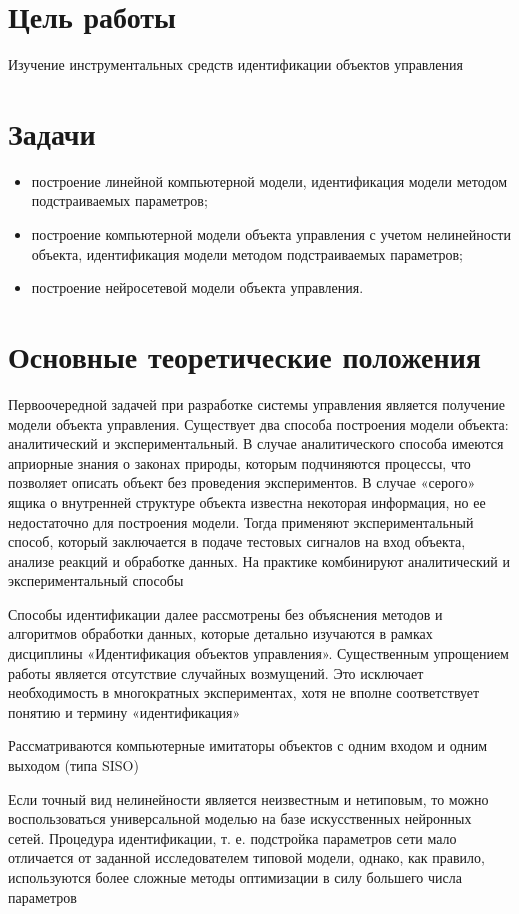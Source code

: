 \section{Цель работы}
Изучение инструментальных средств идентификации объектов управления

\section{Задачи}

\begin{itemize}
	\item построение линейной компьютерной модели, идентификация модели методом подстраиваемых параметров;
	\item построение компьютерной модели объекта управления с учетом нелинейности объекта, идентификация модели методом подстраиваемых параметров;
	\item построение нейросетевой модели объекта управления.
\end{itemize}

\section{Основные теоретические положения}
Первоочередной задачей при разработке системы управления является получение модели объекта управления. Существует два способа построения модели объекта: аналитический и экспериментальный. В случае аналитического способа имеются априорные знания о законах природы, которым подчиняются процессы, что позволяет описать объект без проведения экспериментов. В случае «серого» ящика о внутренней структуре объекта известна некоторая информация, но ее недостаточно для построения модели. Тогда применяют экспериментальный способ, который заключается в подаче тестовых сигналов на вход объекта, анализе реакций и обработке данных. На практике комбинируют аналитический и экспериментальный способы

Способы идентификации далее рассмотрены без объяснения методов и алгоритмов обработки данных, которые детально изучаются в рамках дисциплины «Идентификация объектов управления». Существенным упрощением работы является отсутствие случайных возмущений. Это исключает необходимость в многократных экспериментах, хотя не вполне соответствует понятию и термину «идентификация»

Рассматриваются компьютерные имитаторы объектов с одним входом и одним выходом (типа SISO)

Если точный вид нелинейности является неизвестным и нетиповым, то можно воспользоваться универсальной моделью на базе искусственных нейронных сетей. Процедура идентификации, т. е. подстройка параметров сети мало отличается от заданной исследователем типовой модели, однако, как правило, используются более сложные методы оптимизации в силу большего числа параметров

